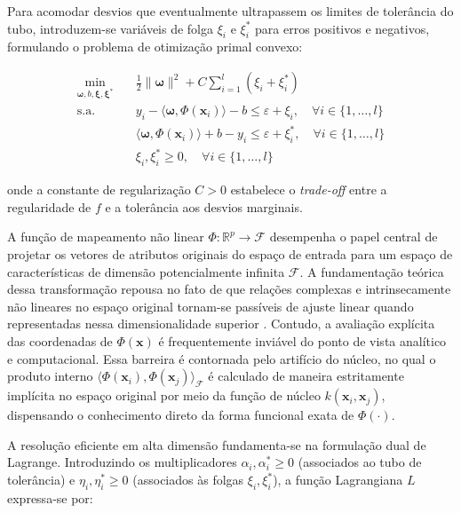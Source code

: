Para acomodar desvios que eventualmente ultrapassem os limites de tolerância do tubo, introduzem-se variáveis de folga $\xi_i$ e $\xi_i^*$ para erros positivos e negativos, formulando o problema de otimização primal convexo:

\begin{align}
    \min_{\boldsymbol{\omega}, b, \boldsymbol{\xi}, \boldsymbol{\xi}^*} & \quad \frac{1}{2}\|\boldsymbol{\omega}\|^2 + C \sum_{i=1}^{l} (\xi_i + \xi_i^*) \label{eq:primal_svr}\\
    \text{s.a.} & \quad y_i - \langle \boldsymbol{\omega}, \Phi(\mathbf{x}_i) \rangle - b \le \varepsilon + \xi_i, \quad \forall i \in \{1, \dots, l\} \label{eq:restr_primal1} \\
    & \quad \langle \boldsymbol{\omega}, \Phi(\mathbf{x}_i) \rangle + b - y_i \le \varepsilon + \xi_i^*, \quad \forall i \in \{1, \dots, l\} \label{eq:restr_primal2} \\
    & \quad \xi_i, \xi_i^* \ge 0, \quad \forall i \in \{1, \dots, l\} \label{eq:restr_primal3}
\end{align}

\noindent onde a constante de regularização $C > 0$ estabelece o \textit{trade-off} entre a regularidade de $f$ e a tolerância aos desvios marginais.

A função de mapeamento não linear $\Phi: \mathbb{R}^p \to \mathcal{F}$ desempenha o papel central de projetar os vetores de atributos originais do espaço de entrada para um espaço de características de dimensão potencialmente infinita $\mathcal{F}$. A fundamentação teórica dessa transformação repousa no fato de que relações complexas e intrinsecamente não lineares no espaço original tornam-se passíveis de ajuste linear quando representadas nessa dimensionalidade superior \cite{muller2001introduction}. Contudo, a avaliação explícita das coordenadas de $\Phi(\mathbf{x})$ é frequentemente inviável do ponto de vista analítico e computacional. Essa barreira é contornada pelo artifício do núcleo, no qual o produto interno $\langle \Phi(\mathbf{x}_i), \Phi(\mathbf{x}_j) \rangle_{\mathcal{F}}$ é calculado de maneira estritamente implícita no espaço original por meio da função de núcleo $k(\mathbf{x}_i, \mathbf{x}_j)$, dispensando o conhecimento direto da forma funcional exata de $\Phi(\cdot)$.

A resolução eficiente em alta dimensão fundamenta-se na formulação dual de Lagrange. Introduzindo os multiplicadores $\alpha_i, \alpha_i^* \ge 0$ (associados ao tubo de tolerância) e $\eta_i, \eta_i^* \ge 0$ (associados às folgas $\xi_i, \xi_i^*$), a função Lagrangiana $L$ expressa-se por:

